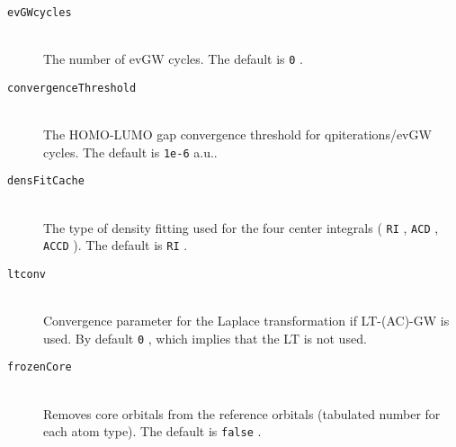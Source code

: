\documentclass[bibliography=totocnumbered,a4paper,10pt,oneside]{scrbook}
\newcommand{\ttt}[1]{%
  \begingroup\setlength{\fboxsep}{1pt}%
  \colorbox{serenity-green!30}{\texttt{\hspace*{2pt}\vphantom{(g}#1\hspace*{2pt}}}%
  \endgroup
}
\begin{document}
\begin{description}
  \item [\texttt{evGWcycles}]\hfill \\
  The number of evGW cycles. The default is \ttt{0}.
  \item [\texttt{convergenceThreshold}]\hfill \\
  The HOMO-LUMO gap convergence threshold for qpiterations/evGW cycles. The default is \ttt{1e-6} a.u..
  \item [\texttt{densFitCache}]\hfill \\
  The type of density fitting used for the four center integrals (\ttt{RI},\ttt{ACD},\ttt{ACCD}). The default is \ttt{RI}.
  \item [\texttt{ltconv}]\hfill \\
  Convergence parameter for the Laplace transformation if LT-(AC)-GW is used. By default \ttt{0}, which implies that the LT is not used.
  \item [\texttt{frozenCore}]\hfill \\
  Removes core orbitals from the reference orbitals (tabulated number for each atom type). The default is \ttt{false}.
  \end{description}
\end{document}
